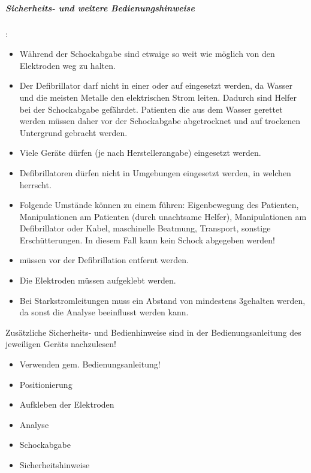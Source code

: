 {\subparagraph{Sicherheits- und weitere Bedienungshinweise}:
\begin{itemize}
  \item Während der Schockabgabe sind etwaige
   so weit wie möglich von den
  Elektroden weg zu halten.
  \item Der Defibrillator darf nicht in einer  oder auf  eingesetzt werden,
  da Wasser und die meisten Metalle den elektrischen Strom
  leiten.
  Dadurch sind Helfer bei der Schockabgabe gefährdet. Patienten die aus dem Wasser gerettet werden
  müssen daher vor der Schockabgabe abgetrocknet und auf
  trockenen Untergrund gebracht werden.
  \item Viele Geräte dürfen  (je nach Herstellerangabe)
  eingesetzt werden.
  \item Defibrillatoren dürfen nicht in Umgebungen
  eingesetzt werden, in welchen 
  herrscht.
  \item Folgende Umstände können zu einem  führen: Eigenbewegung des Patienten,
  Manipulationen am Patienten (durch unachtsame Helfer),
  Manipulationen am Defibrillator oder Kabel, maschinelle
  Beatmung, Transport, sonstige Erschütterungen. In diesem
  Fall kann kein Schock abgegeben werden!
  \item {} müssen vor der
  Defibrillation entfernt werden.
  \item Die Elektroden müssen 
  aufgeklebt werden.
  \item Bei Starkstromleitungen muss ein Abstand von
  mindestens 3\Meter* gehalten werden, da sonst die Analyse
  beeinflusst werden kann.
\end{itemize}
Zusätzliche Sicherheits- und Bedienhinweise sind in der
Bedienungsanleitung des jeweiligen Geräts nachzulesen! }{
\begin{itemize}
  \item Verwenden gem. Bedienungsanleitung!
  \item Positionierung
  \item Aufkleben der Elektroden
  \item Analyse
  \item Schockabgabe
  \item Sicherheitshinweise
\end{itemize}
}{}{}{}

